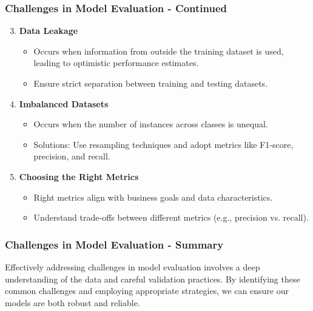 \documentclass[aspectratio=169]{beamer}
\begin{document}
\begin{frame}[fragile]
    \frametitle{Challenges in Model Evaluation - Continued}
    \begin{enumerate} \setcounter{enumi}{2}
        \item \textbf{Data Leakage}
        \begin{itemize}
            \item Occurs when information from outside the training dataset is used, leading to optimistic performance estimates.
            \item Ensure strict separation between training and testing datasets.
        \end{itemize}
        
        \item \textbf{Imbalanced Datasets}
        \begin{itemize}
            \item Occurs when the number of instances across classes is unequal.
            \item Solutions: Use resampling techniques and adopt metrics like F1-score, precision, and recall.
        \end{itemize}
        
        \item \textbf{Choosing the Right Metrics}
        \begin{itemize}
            \item Right metrics align with business goals and data characteristics.
            \item Understand trade-offs between different metrics (e.g., precision vs. recall).
        \end{itemize}
    \end{enumerate}
\end{frame}

\begin{frame}[fragile]
    \frametitle{Challenges in Model Evaluation - Summary}
    Effectively addressing challenges in model evaluation involves a deep understanding of the data and careful validation practices. By identifying these common challenges and employing appropriate strategies, we can ensure our models are both robust and reliable.
\end{frame}
\end{document}
